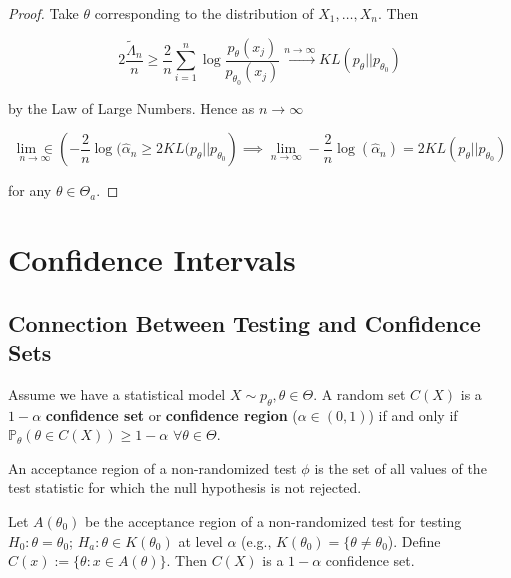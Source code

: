 \begin{proof}
Take \(\theta\) corresponding to the distribution of \(X_1, \ldots, X_n\). Then 

\[
 2 \frac{\tilde{\Lambda}_n}{n}  \geq \frac{2}{n} \sum_{i=1}^n \log \frac{p_\theta(x_j)}{p_{\theta_0}(x_j)} \xrightarrow{n \to \infty} KL(p_\theta || p_{\theta_0})
\]

by the Law of Large Numbers. Hence as \(n \to \infty\)

\[
\underset{n \to \infty}{\lim \in} \left(- \frac{2}{n} \log(\hat{\alpha}_n \geq 2 KL(p_\theta || p_{\theta_0} \right) \implies \lim_{n \to \infty} - \frac{2}{n} \log(\hat{\alpha}_n) = 2 KL(p_\theta || p_{\theta_0})
\]

for any \(\theta \in \Theta_a\).

\end{proof}





%
%
%
%
%
%
%


\section{Confidence Intervals}

\subsection{Connection Between Testing and Confidence Sets}

\begin{definition}

Assume we have a statistical model \(X \sim p_\theta, \theta \in \Theta\). A random set \(C(X)\) is a \(1 - \alpha\) \textbf{confidence set} or \textbf{confidence region} (\(\alpha \in (0,1)\)) if and only if \(\mathbb{P}_\theta (\theta \in C(X)) \geq 1 - \alpha\) \( \forall \theta \in \Theta \).

\end{definition}

\begin{remark}

An acceptance region of a non-randomized test \(\phi\) is the set of all values of the test statistic for which the null hypothesis is not rejected.

\end{remark}

\begin{theorem}

Let \(A(\theta_0)\) be the acceptance region of a non-randomized test for testing \(H_0: \theta = \theta_0\); \(H_a: \theta \in K(\theta_0)\) at level \(\alpha\) (e.g., \(K(\theta_0) = \{ \theta \neq \theta_0\)). Define \(C(x) := \{\theta: x \in A(\theta) \}\). Then \(C(X)\) is a \(1 - \alpha\) confidence set.

\end{theorem}

